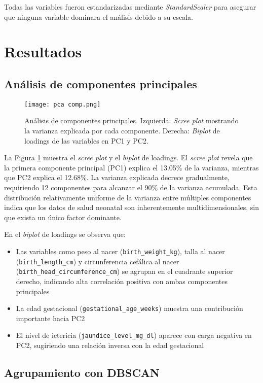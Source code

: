 \documentclass[12pt]{article}
\begin{document}
Todas las variables fueron estandarizadas mediante \emph{StandardScaler} para asegurar que ninguna variable dominara el análisis debido a su escala.

\section{Resultados}
\subsection{Análisis de componentes principales}

\begin{figure}[H]
\centering
\texttt{[image: pca comp.png]}
\caption{Análisis de componentes principales. Izquierda: \emph{Scree plot} mostrando la varianza explicada por cada componente. Derecha: \emph{Biplot} de loadings de las variables en PC1 y PC2.}
\label{fig:pca comp}
\end{figure}

La Figura \ref{fig:pca comp} muestra el \emph{scree plot} y el \emph{biplot} de loadings. El \emph{scree plot} revela que la primera componente principal (PC1) explica el 13.05\% de la varianza, mientras que PC2 explica el 12.68\%. La varianza explicada decrece gradualmente, requiriendo 12 componentes para alcanzar el 90\% de la varianza acumulada. Esta distribución relativamente uniforme de la varianza entre múltiples componentes indica que los datos de salud neonatal son inherentemente multidimensionales, sin que exista un único factor dominante.

En el \emph{biplot} de loadings se observa que:
\begin{itemize}
\item Las variables como peso al nacer (\texttt{birth\_weight\_kg}), talla al nacer (\texttt{birth\_length\_cm}) y circunferencia cefálica al nacer (\texttt{birth\_head\_circumference\_cm}) se agrupan en el cuadrante superior derecho, indicando alta correlación positiva con ambas componentes principales
\item La edad gestacional (\texttt{gestational\_age\_weeks}) muestra una contribución importante hacia PC2
\item El nivel de ictericia (\texttt{jaundice\_level\_mg\_dl}) aparece con carga negativa en PC2, sugiriendo una relación inversa con la edad gestacional
\end{itemize}


\subsection{Agrupamiento con DBSCAN}
\end{document}
